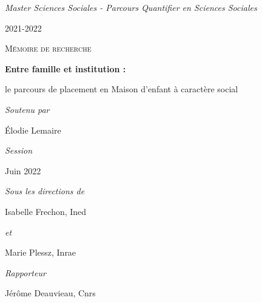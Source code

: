 \documentclass[
  12,
  a4paper,
]{report}
\author{}
\date{\vspace{-2.5em}}
\begin{document}
\begin{titlepage}

\par
{}
\hfill
{}
\par


\vspace{1cm}
\begin{center}

\normalsize{\textit{Master Sciences Sociales - Parcours Quantifier en Sciences Sociales}}

2021-2022

\vspace{5mm}

\textsc{Mémoire de recherche}

\vfill 

{\LARGE\bfseries Entre famille et institution :\par}

{\Large le parcours de placement en Maison d'enfant à caractère social\par}

\vfill

{\large\itshape Soutenu par}

{\large Élodie Lemaire}

\vspace{5mm}

\textit{Session}

Juin 2022

\vspace{5mm}

\textit{Sous les directions de}

Isabelle Frechon, Ined

\textit{et}

Marie Plessz, Inrae


\vspace{5mm}

\textit{Rapporteur}

Jérôme Deauvieau, Cnrs

\end{center}
\end{titlepage}
\newpage
\end{document}
